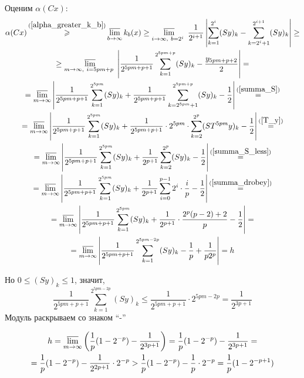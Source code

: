 \documentclass[a5paper,12pt,openbib]{report}
\begin{document}
Оценим $\alpha(Cx)$:
\begin{multline*}
	\alpha (Cx) \mathop{\geqslant}^{(\ref{alpha_greater_k_b})}
	\varlimsup_{b\to \infty} k_b(x) \geq
	\varlimsup_{
		i\to \infty,~
		b=2^i~
	}\frac{1}{2^{i+1}}\left|
		\sum_{k=1}^{2^i}(Sy)_k - \sum_{k=2^i+1}^{2^{i+1}}(Sy)_k
	\right| \geq
	\\ \geq
	\varlimsup_{
		m\to \infty,~
		i=5pm+p~
	}\left|
		\frac{1}{2^{5pm+p+1}}\sum_{k=1}^{2^{5pm+p}}(Sy)_k - \frac{y_{5pm+p+2}}{2}
	\right| =
	\\=
	\varlimsup_{m\to \infty}\left|
		\frac{1}{2^{5pm+p+1}}\sum_{k=1}^{2^{5pm}}(Sy)_k
		+
		\frac{1}{2^{5pm+p+1}}\sum_{k=2^{5pm}+1}^{2^{5pm+p}}(Sy)_k
		- \frac{1}{2}
	\right|
	\mathop{=}^{(\ref{summa_S})}
	\\=
	\varlimsup_{m\to \infty}\left|
		\frac{1}{2^{5pm+p+1}}\sum_{k=1}^{2^{5pm}}(Sy)_k
		+
		\frac{1}{2^{5pm+p+1}} \cdot 2^{5pm} \cdot \sum_{k=2}^{2^p}(ST^{5pm}y)_k
		- \frac{1}{2}
	\right|
	\mathop{=}^{(\ref{T_y})}
	\\=
	\varlimsup_{m\to \infty}\left|
		\frac{1}{2^{5pm+p+1}}\sum_{k=1}^{2^{5pm}}(Sy)_k
		+
		\frac{1}{2^{p+1}} \sum_{k=2}^{2^p}(Sy)_k
		- \frac{1}{2}
	\right|
	\mathop{=}^{(\ref{summa_S_less})}
	\\=
	\varlimsup_{m\to \infty}\left|
		\frac{1}{2^{5pm+p+1}}\sum_{k=1}^{2^{5pm}}(Sy)_k
		+
		\frac{1}{2^{p+1}} \sum_{i=0}^{p-1}2^i \cdot \frac{i}{p}
		- \frac{1}{2}
	\right|
	\mathop{=}^{(\ref{summa_drobey})}
	\\=
	\varlimsup_{m\to \infty}\left|
		\frac{1}{2^{5pm+p+1}}\sum_{k=1}^{2^{5pm}}(Sy)_k
		+
		\frac{1}{2^{p+1}} \cdot \frac{2^p(p-2)+2}{p}
		- \frac{1}{2}
	\right| =
	\\=
	\varlimsup_{m\to \infty}\left|
		\frac{1}{2^{5pm+p+1}}\sum_{k=1}^{2^{5pm-2p}}(Sy)_k
		-\frac{1}{p} + \frac{1}{p 2^p}
	\right| = h
\end{multline*}

Но $0 \leq (Sy)_k \leq 1$,
значит,
$$
	\frac{1}{2^{5pm+p+1}}\sum_{k=1}^{2^{5pm-2p}}(Sy)_k
	\leq
	\frac{1}{2^{5pm+p+1}} \cdot 2^{5pm-2p}
	=
	\frac{1}{2^{3p+1}}
$$
Модуль раскрываем со знаком ``-''

\begin{multline*}
	h=
	\varlimsup_{m\to \infty} \left(
		\frac{1}{p} (1-2^{-p})
		- \frac{1}{2^{3p+1}}
	\right) =
	\frac{1}{p} (1-2^{-p})
	- \frac{1}{2^{3p+1}}
	= \\ =
	\frac{1}{p} (1-2^{-p})
	- \frac{1}{2^{2p+1}} \cdot 2^{-p}
	>
	\frac{1}{p} (1-2^{-p})
	- \frac{1}{p} \cdot 2^{-p}
	=
	\frac{1}{p} (1-2^{-p+1})
\end{multline*}
\end{document}
